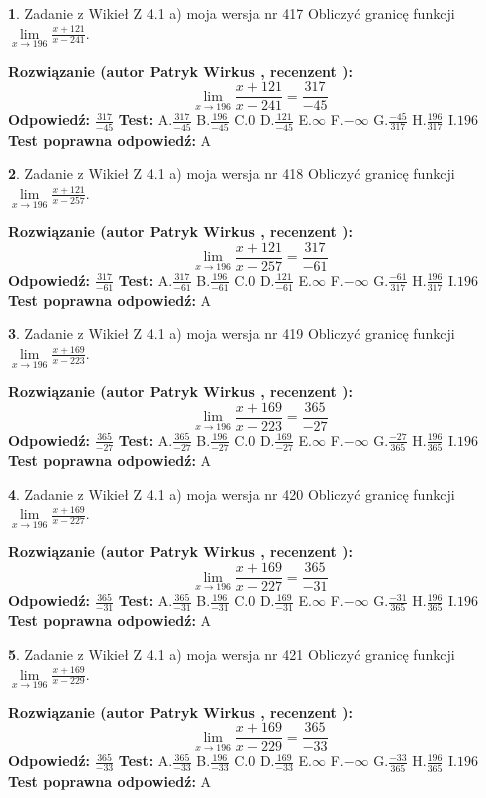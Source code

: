 \documentclass[12pt, a4paper]{article}
\theoremstyle{definition} %
\newtheorem{zad}{}
\newcommand{\zadStart}[1]{\begin{zad}#1\newline}
\newcommand{\zadStop}{\end{zad}}
\newcommand{\rozwStart}[2]{\noindent \textbf{Rozwiązanie (autor #1 , recenzent #2): }\newline}
\newcommand{\rozwStop}{\newline}
\newcommand{\odpStart}{\noindent \textbf{Odpowiedź:}\newline}
\newcommand{\odpStop}{\newline}
\newcommand{\testStart}{\noindent \textbf{Test:}\newline}
\newcommand{\testStop}{\newline}
\newcommand{\kluczStart}{\noindent \textbf{Test poprawna odpowiedź:}\newline}
\newcommand{\kluczStop}{\newline}
\begin{document}
\zadStart{Zadanie z Wikieł Z 4.1 a) moja wersja nr 417}
Obliczyć granicę funkcji $\lim\limits_{x\to196}\frac{x+121}{x-241}$.
\zadStop
\rozwStart{Patryk Wirkus}{}
$$\lim\limits_{x\to196}\frac{x+121}{x-241} = \frac{317}{-45}$$
\rozwStop
\odpStart
$\frac{317}{-45}$
\odpStop
\testStart
A.$\frac{317}{-45}$
B.$\frac{196}{-45}$
C.$0$
D.$\frac{121}{-45}$
E.$\infty$
F.$-\infty$
G.$\frac{-45}{317}$
H.$\frac{196}{317}$
I.$196$
\testStop
\kluczStart
A
\kluczStop



\zadStart{Zadanie z Wikieł Z 4.1 a) moja wersja nr 418}
Obliczyć granicę funkcji $\lim\limits_{x\to196}\frac{x+121}{x-257}$.
\zadStop
\rozwStart{Patryk Wirkus}{}
$$\lim\limits_{x\to196}\frac{x+121}{x-257} = \frac{317}{-61}$$
\rozwStop
\odpStart
$\frac{317}{-61}$
\odpStop
\testStart
A.$\frac{317}{-61}$
B.$\frac{196}{-61}$
C.$0$
D.$\frac{121}{-61}$
E.$\infty$
F.$-\infty$
G.$\frac{-61}{317}$
H.$\frac{196}{317}$
I.$196$
\testStop
\kluczStart
A
\kluczStop



\zadStart{Zadanie z Wikieł Z 4.1 a) moja wersja nr 419}
Obliczyć granicę funkcji $\lim\limits_{x\to196}\frac{x+169}{x-223}$.
\zadStop
\rozwStart{Patryk Wirkus}{}
$$\lim\limits_{x\to196}\frac{x+169}{x-223} = \frac{365}{-27}$$
\rozwStop
\odpStart
$\frac{365}{-27}$
\odpStop
\testStart
A.$\frac{365}{-27}$
B.$\frac{196}{-27}$
C.$0$
D.$\frac{169}{-27}$
E.$\infty$
F.$-\infty$
G.$\frac{-27}{365}$
H.$\frac{196}{365}$
I.$196$
\testStop
\kluczStart
A
\kluczStop



\zadStart{Zadanie z Wikieł Z 4.1 a) moja wersja nr 420}
Obliczyć granicę funkcji $\lim\limits_{x\to196}\frac{x+169}{x-227}$.
\zadStop
\rozwStart{Patryk Wirkus}{}
$$\lim\limits_{x\to196}\frac{x+169}{x-227} = \frac{365}{-31}$$
\rozwStop
\odpStart
$\frac{365}{-31}$
\odpStop
\testStart
A.$\frac{365}{-31}$
B.$\frac{196}{-31}$
C.$0$
D.$\frac{169}{-31}$
E.$\infty$
F.$-\infty$
G.$\frac{-31}{365}$
H.$\frac{196}{365}$
I.$196$
\testStop
\kluczStart
A
\kluczStop



\zadStart{Zadanie z Wikieł Z 4.1 a) moja wersja nr 421}
Obliczyć granicę funkcji $\lim\limits_{x\to196}\frac{x+169}{x-229}$.
\zadStop
\rozwStart{Patryk Wirkus}{}
$$\lim\limits_{x\to196}\frac{x+169}{x-229} = \frac{365}{-33}$$
\rozwStop
\odpStart
$\frac{365}{-33}$
\odpStop
\testStart
A.$\frac{365}{-33}$
B.$\frac{196}{-33}$
C.$0$
D.$\frac{169}{-33}$
E.$\infty$
F.$-\infty$
G.$\frac{-33}{365}$
H.$\frac{196}{365}$
I.$196$
\testStop
\kluczStart
A
\kluczStop
\end{document}
